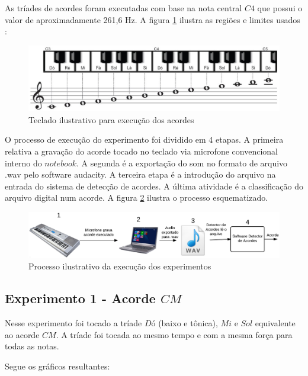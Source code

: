 \newpage
As tríades de acordes foram executadas com base na nota central $C4$ que possui o valor de aproximadamente 261,6 Hz. A figura \ref{fig:teclado} ilustra as regiões e limites usados \cite{teclado}:

\begin{figure}[h]
	\centering
		\includegraphics[keepaspectratio=true,scale=0.4]{figuras/teclado-tcc1.eps}
	\caption{Teclado ilustrativo para execução dos acordes}
  \label{fig:teclado}
\end{figure}

O processo de execução do experimento foi dividido em 4 etapas. A primeira relativa a gravação do acorde tocado no teclado via microfone convencional interno do $notebook$. A segunda é a exportação do som no formato de arquivo .wav pelo software audacity. A terceira etapa é a introdução do arquivo na entrada do sistema de detecção de acordes. A última atividade é a classificação do arquivo digital num acorde. A figura \ref{fig:processo} ilustra o processo esquematizado.

\begin{figure}[h]
	\centering
		\includegraphics[keepaspectratio=true,scale=0.35]{figuras/processo_experimento.eps}
	\caption{Processo ilustrativo da execução dos experimentos}
  \label{fig:processo}
\end{figure}

\newpage
\subsection{Experimento 1 - Acorde $CM$}
\label{sec:experimento1}

Nesse experimento foi tocado a tríade $Dó$ (baixo e tônica), $Mi$ e $Sol$ equivalente ao acorde $CM$. A tríade foi tocada ao mesmo tempo e com a mesma força para todas as notas.

Segue os gráficos resultantes:

